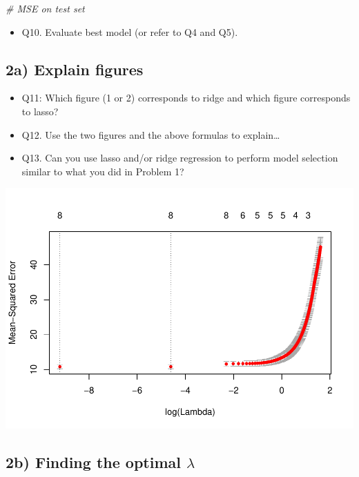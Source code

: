 \documentclass[]{article}
\newenvironment{Shaded}{\begin{snugshade}}{\end{snugshade}}
\newcommand{\CommentTok}[1]{\textcolor[rgb]{0.56,0.35,0.01}{\textit{#1}}}
\providecommand{\tightlist}{%
  \setlength{\itemsep}{0pt}\setlength{\parskip}{0pt}}
\begin{document}
\begin{Shaded}
\begin{Highlighting}[]
\CommentTok{# MSE on test set}
\end{Highlighting}
\end{Shaded}

\begin{itemize}
\tightlist
\item
  Q10. Evaluate best model (or refer to Q4 and Q5).
\end{itemize}

\subsection{2a) Explain figures}\label{a-explain-figures}

\begin{itemize}
\tightlist
\item
  Q11: Which figure (1 or 2) corresponds to ridge and which figure
  corresponds to lasso?
\item
  Q12. Use the two figures and the above formulas to explain\ldots{}
\item
  Q13. Can you use lasso and/or ridge regression to perform model
  selection similar to what you did in Problem 1?
\end{itemize}

\includegraphics{1_files/figure-latex/unnamed-chunk-5-1.pdf}

\subsection{\texorpdfstring{2b) Finding the optimal
\(\lambda\)}{2b) Finding the optimal \textbackslash{}lambda}}\label{b-finding-the-optimal-lambda}
\end{document}
